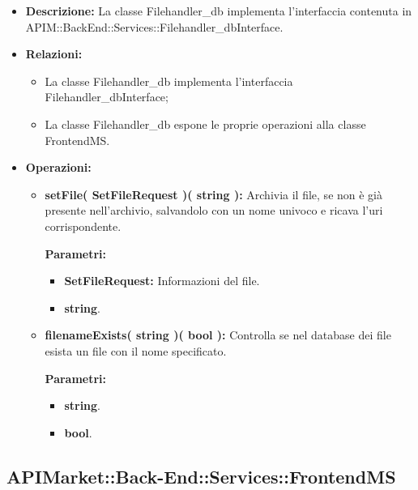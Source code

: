 \begin{itemize}
	\item \textbf{Descrizione:} La classe Filehandler\_db implementa l'interfaccia contenuta in APIM::BackEnd::Services::Filehandler\_dbInterface.
	\item \textbf{Relazioni:}
		\begin{itemize}
			\item La classe Filehandler\_db implementa l'interfaccia Filehandler\_dbInterface;
			\item La classe Filehandler\_db espone le proprie operazioni alla classe FrontendMS.
		\end{itemize}
	\item \textbf{Operazioni:}
		\begin{itemize}
		
			\item \textbf{setFile( SetFileRequest )( string ):} Archivia il file, se non è già presente nell'archivio, salvandolo con un nome univoco e ricava l'uri corrispondente.
				\begin{description}
    				\item[\textbf{Parametri:}]
				\end{description}
				\begin{itemize}
					\item \textbf{SetFileRequest:} Informazioni del file.
					\item \textbf{string}.
				\end{itemize}
				
			\item \textbf{filenameExists( string )( bool ):} Controlla se nel database dei file esista un file con il nome specificato.
				\begin{description}
    				\item[\textbf{Parametri:}]
				\end{description}
				\begin{itemize}
					\item \textbf{string}.
					\item \textbf{bool}.
				\end{itemize}
				
		\end{itemize}
\end{itemize}

\subsection{APIMarket::Back-End::Services::FrontendMS}

